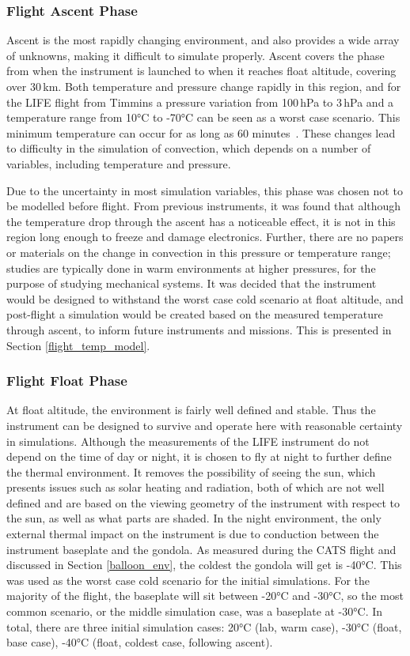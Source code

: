 \subsubsection{Flight Ascent Phase}
Ascent is the most rapidly changing environment, and also provides a wide array of unknowns, making it difficult to simulate properly. Ascent covers the phase from when the instrument is launched to when it reaches float altitude, covering over 30\,km. Both temperature and pressure change rapidly in this region, and for the LIFE flight from Timmins a pressure variation from 100\,hPa to 3\,hPa and a temperature range from 10°C to -70°C can be seen as a worst case scenario. This minimum temperature can occur for as long as 60 minutes~\citep{STRATOS_CARMENCITA_doc}. These changes lead to difficulty in the simulation of convection, which depends on a number of variables, including temperature and pressure.

Due to the uncertainty in most simulation variables, this phase was chosen not to be modelled before flight. From previous instruments, it was found that although the temperature drop through the ascent has a noticeable effect, it is not in this region long enough to freeze and damage electronics. Further, there are no papers or materials on the change in convection in this pressure or temperature range; studies are typically done in warm environments at higher pressures, for the purpose of studying mechanical systems. It was decided that the instrument would be designed to withstand the worst case cold scenario at float altitude, and post-flight a simulation would be created based on the measured temperature through ascent, to inform future instruments and missions. This is presented in Section \ref{flight_temp_model}.

\subsubsection{Flight Float Phase}
At float altitude, the environment is fairly well defined and stable. Thus the instrument can be designed to survive and operate here with reasonable certainty in simulations. Although the measurements of the LIFE instrument do not depend on the time of day or night, it is chosen to fly at night to further define the thermal environment. It removes the possibility of seeing the sun, which presents issues such as solar heating and radiation, both of which are not well defined and are based on the viewing geometry of the instrument with respect to the sun, as well as what parts are shaded. In the night environment, the only external thermal impact on the instrument is due to conduction between the instrument baseplate and the gondola. As measured during the CATS flight and discussed in Section \ref{balloon_env}, the coldest the gondola will get is -40°C. This was used as the worst case cold scenario for the initial simulations. For the majority of the flight, the baseplate will sit between -20°C and -30°C, so the most common scenario, or the middle simulation case, was a baseplate at -30°C. In total, there are three initial simulation cases: 20°C (lab, warm case), -30°C (float, base case), -40°C (float, coldest case, following ascent). 

